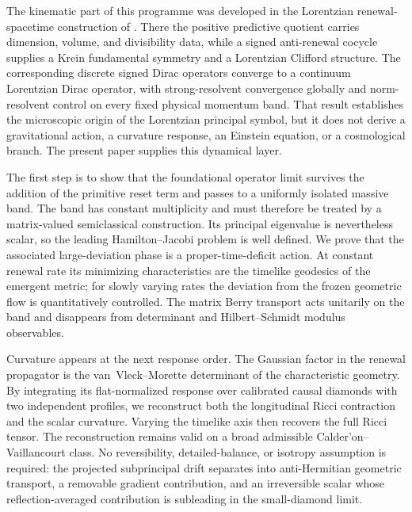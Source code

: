 \documentclass[11pt]{article}
\theoremstyle{definition}
\theoremstyle{remark}
\begin{document}
The kinematic part of this programme was developed in the Lorentzian renewal-spacetime construction of \cite{PelissierLorentzian}.  There the positive predictive quotient carries dimension, volume, and divisibility data, while a signed anti-renewal cocycle supplies a Krein fundamental symmetry and a Lorentzian Clifford structure.  The corresponding discrete signed Dirac operators converge to a continuum Lorentzian Dirac operator, with strong-resolvent convergence globally and norm-resolvent control on every fixed physical momentum band.  That result establishes the microscopic origin of the Lorentzian principal symbol, but it does not derive a gravitational action, a curvature response, an Einstein equation, or a cosmological branch.  The present paper supplies this dynamical layer.

The first step is to show that the foundational operator limit survives the addition of the primitive reset term and passes to a uniformly isolated massive band.  The band has constant multiplicity and must therefore be treated by a matrix-valued semiclassical construction.  Its principal eigenvalue is nevertheless scalar, so the leading Hamilton--Jacobi problem is well defined.  We prove that the associated large-deviation phase is a proper-time-deficit action.  At constant renewal rate its minimizing characteristics are the timelike geodesics of the emergent metric; for slowly varying rates the deviation from the frozen geometric flow is quantitatively controlled.  The matrix Berry transport acts unitarily on the band and disappears from determinant and Hilbert--Schmidt modulus observables.

Curvature appears at the next response order.  The Gaussian factor in the renewal propagator is the van~Vleck--Morette determinant of the characteristic geometry.  By integrating its flat-normalized response over calibrated causal diamonds with two independent profiles, we reconstruct both the longitudinal Ricci contraction and the scalar curvature.  Varying the timelike axis then recovers the full Ricci tensor.  The reconstruction remains valid on a broad admissible Calder'on--Vaillancourt class.  No reversibility, detailed-balance, or isotropy assumption is required: the projected subprincipal drift separates into anti-Hermitian geometric transport, a removable gradient contribution, and an irreversible scalar whose reflection-averaged contribution is subleading in the small-diamond limit.
\end{document}
